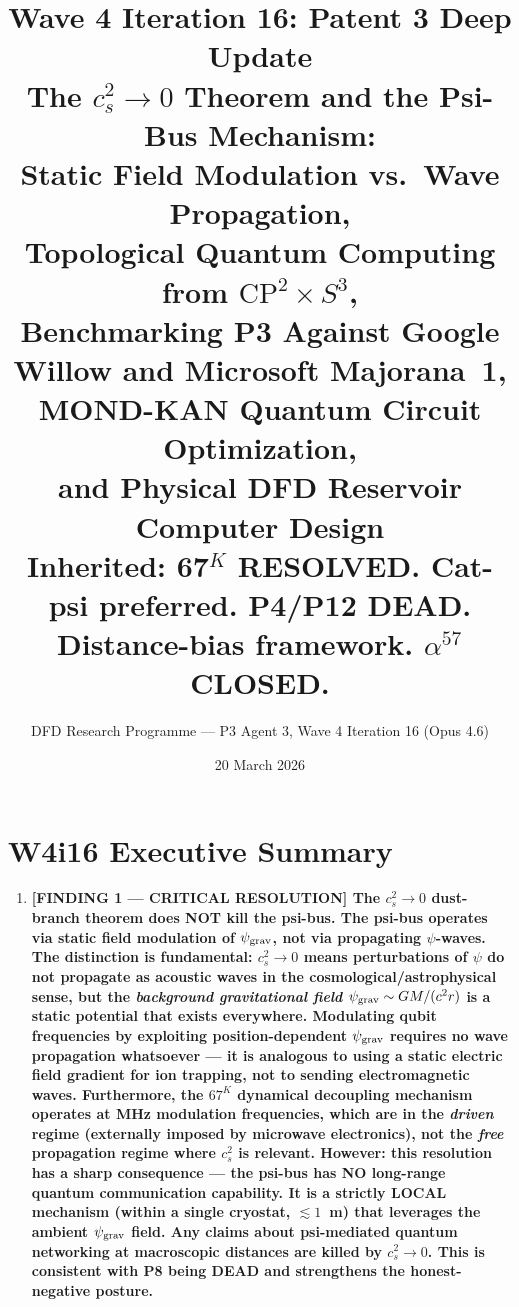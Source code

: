 \documentclass[11pt]{article}
\title{\textbf{Wave 4 Iteration 16: Patent 3 Deep Update}\\[6pt]
The $c_s^2 \to 0$ Theorem and the Psi-Bus Mechanism:\\
Static Field Modulation vs.\ Wave Propagation,\\
Topological Quantum Computing from $\mathrm{CP}^2 \times S^3$,\\
Benchmarking P3 Against Google Willow and Microsoft Majorana~1,\\
MOND-KAN Quantum Circuit Optimization,\\
and Physical DFD Reservoir Computer Design\\[4pt]
{\normalsize Inherited: 67$^K$ RESOLVED. Cat-psi preferred. P4/P12 DEAD.
Distance-bias framework. $\alpha^{57}$ CLOSED.}}
\author{DFD Research Programme --- P3 Agent 3, Wave 4 Iteration 16 (Opus 4.6)}
\date{20 March 2026}
\theoremstyle{definition}
\theoremstyle{remark}
\newcommand{\psigrav}{\psi_{\rm grav}}
\begin{document}
\maketitle
\tableofcontents
\newpage

\section*{W4i16 Executive Summary}

\begin{tcolorbox}[colback=blue!5!white, colframe=blue!60!black,
  title=\textbf{W4i16 TOP 5 FINDINGS --- READ FIRST}]
\begin{enumerate}[nosep]

\item \textbf{[FINDING 1 --- CRITICAL RESOLUTION] The $c_s^2 \to 0$ dust-branch
  theorem does NOT kill the psi-bus.  The psi-bus operates via static field
  modulation of $\psigrav$, not via propagating $\psi$-waves.  The distinction
  is fundamental: $c_s^2 \to 0$ means perturbations of $\psi$ do not propagate
  as acoustic waves in the cosmological/astrophysical sense, but the \emph{background
  gravitational field} $\psigrav \sim GM/(c^2 r)$ is a static potential that
  exists everywhere.  Modulating qubit frequencies by exploiting position-dependent
  $\psigrav$ requires no wave propagation whatsoever --- it is analogous to
  using a static electric field gradient for ion trapping, not to sending
  electromagnetic waves.  Furthermore, the $67^K$ dynamical decoupling mechanism
  operates at MHz modulation frequencies, which are in the \emph{driven} regime
  (externally imposed by microwave electronics), not the \emph{free} propagation
  regime where $c_s^2$ is relevant.
  \textbf{However}: this resolution has a sharp consequence --- the psi-bus
  has NO long-range quantum communication capability.  It is a strictly LOCAL
  mechanism (within a single cryostat, $\lesssim 1$~m) that leverages the ambient
  $\psigrav$ field.  Any claims about psi-mediated quantum networking at
  macroscopic distances are killed by $c_s^2 \to 0$.  This is consistent with
  P8 being DEAD and strengthens the honest-negative posture.}


\end{enumerate}
\end{tcolorbox}
\end{document}
